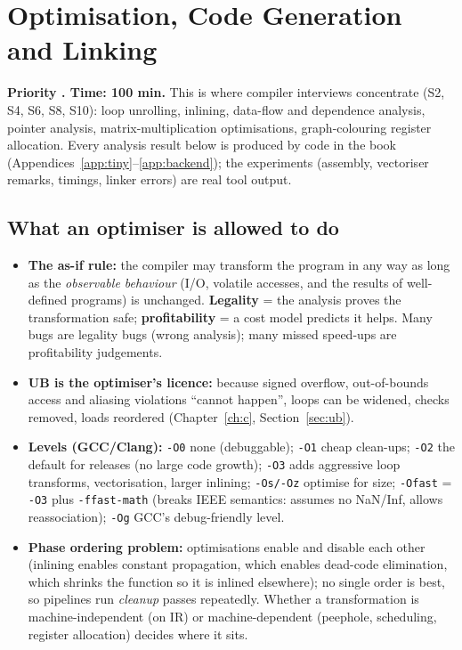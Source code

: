 \documentclass[10pt,a4paper,openany,oneside]{report}
\newcommand{\prio}[1]{\texorpdfstring{\ifcase#1\or{\color{gold}\ding{72}}\or{\color{gold}\ding{72}\ding{72}}\or{\color{gold}\ding{72}\ding{72}\ding{72}}\fi}{}}
\begin{document}
\chapter{Optimisation, Code Generation and Linking}
\label{ch:opt}

\begin{chapbox}
\textbf{Priority \prio{3}. Time: 100 min.} This is where compiler interviews concentrate (S2, S4, S6, S8, S10): loop unrolling, inlining, data-flow and dependence analysis, pointer analysis, matrix-multiplication optimisations, graph-colouring register allocation.
Every analysis result below is produced by code in the book (Appendices~\ref{app:tiny}--\ref{app:backend}); the experiments (assembly, vectoriser remarks, timings, linker errors) are real tool output.
\end{chapbox}




\section{What an optimiser is allowed to do \prio{3}}
\begin{mustbox}
\begin{itemize}[nosep]
\item \textbf{The as-if rule:} the compiler may transform the program in any way as long as the \emph{observable behaviour} (I/O, volatile accesses, and the results of well-defined programs) is unchanged. \textbf{Legality} = the analysis proves the transformation safe; \textbf{profitability} = a cost model predicts it helps. Many bugs are legality bugs (wrong analysis); many missed speed-ups are profitability judgements.
\item \textbf{UB is the optimiser's licence:} because signed overflow, out-of-bounds access and aliasing violations ``cannot happen'', loops can be widened, checks removed, loads reordered (Chapter~\ref{ch:c}, Section~\ref{sec:ub}).
\item \textbf{Levels (GCC/Clang):} \texttt{-O0} none (debuggable); \texttt{-O1} cheap clean-ups; \texttt{-O2} the default for releases (no large code growth); \texttt{-O3} adds aggressive loop transforms, vectorisation, larger inlining; \texttt{-Os/-Oz} optimise for size; \texttt{-Ofast} = \texttt{-O3} plus \texttt{-ffast-math} (breaks IEEE semantics: assumes no NaN/Inf, allows reassociation); \texttt{-Og} GCC's debug-friendly level.
\item \textbf{Phase ordering problem:} optimisations enable and disable each other (inlining enables constant propagation, which enables dead-code elimination, which shrinks the function so it is inlined elsewhere); no single order is best, so pipelines run \emph{cleanup} passes repeatedly. Whether a transformation is machine-independent (on IR) or machine-dependent (peephole, scheduling, register allocation) decides where it sits.
\end{itemize}
\end{mustbox}
\end{document}

